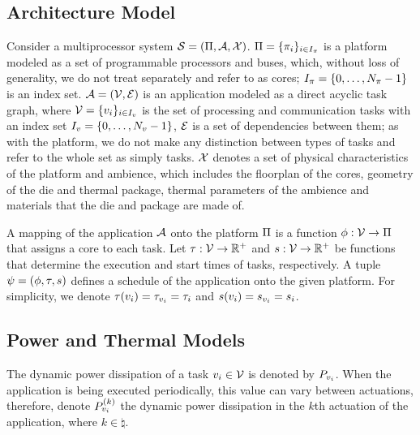 \subsection{Architecture Model}
Consider a multiprocessor system $\mathcal{S} = (\Pi, \mathcal{A}, \mathcal{X})$. $\Pi = \{ \pi_i \}_{i \in I_\pi}$ is a platform modeled as a set of programmable processors and buses, which, without loss of generality, we do not treat separately and refer to as cores; $I_\pi = \{0, \dots, N_\pi - 1\}$ is an index set. $\mathcal{A} = (\mathcal{V}, \mathcal{E})$ is an application modeled as a direct acyclic task graph, where $\mathcal{V} = \{ v_i \}_{i \in I_v}$ is the set of processing and communication tasks with an index set $I_v = \{ 0, \dots, N_v - 1 \}$, $\mathcal{E}$ is a set of dependencies between them; as with the platform, we do not make any distinction between types of tasks and refer to the whole set as simply tasks. $\mathcal{X}$ denotes a set of physical characteristics of the platform and ambience, which includes the floorplan of the cores, geometry of the die and thermal package, thermal parameters of the ambience and materials that the die and package are made of.

A mapping of the application $\mathcal{A}$ onto the platform $\Pi$ is a function $\phi: \mathcal{V} \to \Pi$ that assigns a core to each task. Let $\tau: \mathcal{V} \to \mathbb{R}^{+}$ and $s: \mathcal{V} \to \mathbb{R}^{+}$ be functions that determine the execution and start times of tasks, respectively. A tuple $\psi = (\phi, \tau, s)$ defines a schedule of the application onto the given platform. For simplicity, we denote $\tau(v_i) = \tau_{v_i} = \tau_i$ and $s(v_i) = s_{v_i} = s_i$.

\subsection{Power and Thermal Models}
The dynamic power dissipation of a task $v_i \in \mathcal{V}$ is denoted by $P_{v_i}$. When the application is being executed periodically, this value can vary between actuations, therefore, denote $P^{(k)}_{v_i}$ the dynamic power dissipation in the $k$th actuation of the application, where $k \in \natural$.

